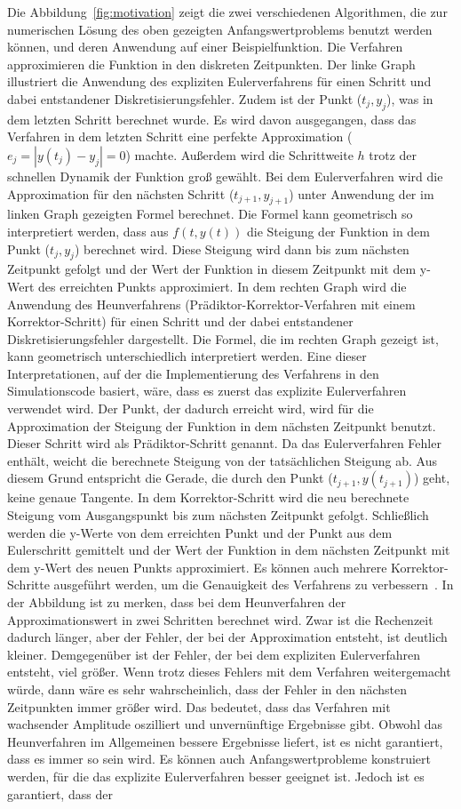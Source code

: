 \documentclass{listhesis}
\begin{document}
Die Abbildung~\ref{fig:motivation} zeigt die zwei verschiedenen Algorithmen, die zur numerischen Lösung des oben gezeigten Anfangswertproblems benutzt werden können, und deren Anwendung auf einer Beispielfunktion. Die Verfahren approximieren die Funktion in den diskreten Zeitpunkten. Der linke Graph illustriert die Anwendung des expliziten Eulerverfahrens für einen Schritt und dabei entstandener Diskretisierungsfehler. Zudem ist der Punkt ($t_j,y_j$), was in dem letzten Schritt berechnet wurde. Es wird davon ausgegangen, dass das Verfahren in dem letzten Schritt eine perfekte Approximation ($e_j = |y(t_j) - y_j| = 0$) machte. Außerdem wird die Schrittweite $h$ trotz der schnellen Dynamik der Funktion groß gewählt. Bei dem Eulerverfahren wird die Approximation für den nächsten Schritt ($t_{j+1}, y_{j+1}$) unter Anwendung der im linken Graph gezeigten Formel berechnet. Die Formel kann geometrisch so interpretiert werden, dass aus $f(t,y(t))$ die Steigung der Funktion in dem Punkt ($t_j, y_j$) berechnet wird. Diese Steigung wird dann bis zum nächsten Zeitpunkt gefolgt und der Wert der Funktion in diesem Zeitpunkt mit dem y-Wert des erreichten Punkts approximiert. In dem rechten Graph wird die Anwendung des Heunverfahrens (Prädiktor-Korrektor-Verfahren mit einem Korrektor-Schritt) für einen Schritt und der dabei entstandener Diskretisierungsfehler dargestellt. Die Formel, die im rechten Graph gezeigt ist, kann geometrisch unterschiedlich interpretiert werden. Eine dieser Interpretationen, auf der die Implementierung des Verfahrens in den Simulationscode basiert, wäre, dass es zuerst das explizite Eulerverfahren verwendet wird. Der Punkt, der dadurch erreicht wird, wird für die Approximation der Steigung der Funktion in dem nächsten Zeitpunkt benutzt. Dieser Schritt wird als Prädiktor-Schritt genannt. Da das Eulerverfahren Fehler enthält, weicht die berechnete Steigung von der tatsächlichen Steigung ab. Aus diesem Grund entspricht die Gerade, die durch den Punkt ($t_{j+1},y(t_{j+1})$) geht, keine genaue Tangente. In dem Korrektor-Schritt wird die neu berechnete Steigung vom Ausgangspunkt bis zum nächsten Zeitpunkt gefolgt. Schließlich werden die y-Werte von dem erreichten Punkt und der Punkt aus dem Eulerschritt gemittelt und der Wert der Funktion in dem nächsten Zeitpunkt mit dem y-Wert des neuen Punkts approximiert. Es können auch mehrere Korrektor-Schritte ausgeführt werden, um die Genauigkeit des Verfahrens zu verbessern~\cite{butcher}. In der Abbildung ist zu merken, dass bei dem Heunverfahren der Approximationswert in zwei Schritten berechnet wird. Zwar ist die Rechenzeit dadurch länger, aber der Fehler, der bei der Approximation entsteht, ist deutlich kleiner. Demgegenüber ist der Fehler, der bei dem expliziten Eulerverfahren entsteht, viel größer. Wenn trotz dieses Fehlers mit dem Verfahren weitergemacht würde, dann wäre es sehr wahrscheinlich, dass der Fehler in den nächsten Zeitpunkten immer größer wird. Das bedeutet, dass das Verfahren mit wachsender Amplitude oszilliert und unvernünftige Ergebnisse gibt. Obwohl das Heunverfahren im Allgemeinen bessere Ergebnisse liefert, ist es nicht garantiert, dass es immer so sein wird. Es können auch Anfangswertprobleme konstruiert werden, für die das explizite Eulerverfahren besser geeignet ist. Jedoch ist es garantiert, dass der 
\end{document}
